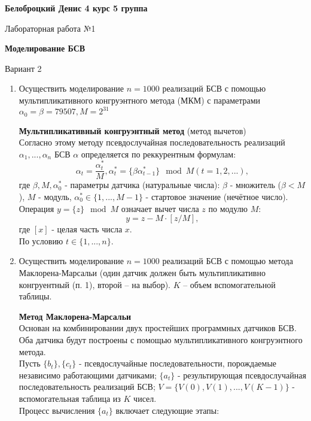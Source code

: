 \documentclass[12pt]{article}
\begin{document}
\par \textbf{Белоброцкий Денис 4 курс 5 группа}
\begin{center}
Лабораторная работа №1 
\end{center} 
\begin{center}
\textbf{Моделирование БСВ}
\end{center} 
\begin{center}
Вариант 2
\end{center}

\begin{enumerate}
\item Осуществить моделирование $ n = 1000 $ реализаций БСВ с помощью мультипликативного конгруэнтного метода (МКМ) с параметрами $ \alpha_{0} = \beta = 79507, M = 2^{31} $
\par \textbf{Мультипликативный конгруэнтный метод} (метод вычетов) 
\\Согласно этому методу псевдослучайная последовательность реализаций $ \alpha_{1},...,\alpha_{n} $ БСВ $ \alpha $ определяется по реккурентным формулам: 
$$
\alpha_{t} = \frac{\alpha_{t}^{*}}{M}, \alpha_{t}^{*} = \lbrace \beta\alpha_{t-1}^{*} \rbrace \!\!\!\!\! \mod M (t=1,2,...),
$$
где $ \beta ,M, \alpha_{0}^{*} $ - параметры датчика (натуральные числа): $ \beta $ - множитель ($ \beta < M $), $ M $ - модуль, $ \alpha_{0}^{*} \in\lbrace 1,...,M-1 \rbrace $ - стартовое значение (нечётное число).
Операция $ y=\lbrace z \rbrace \mod M $ означает вычет числа $ z $ по модулю $ M $:
$$
y = z - M \cdot [z / M],
$$
где $ [x] $ - целая часть числа $ x $.
\\По условию $ t\in\lbrace 1,...,n \rbrace $.
\item Осуществить моделирование $ n=1000 $ реализаций БСВ с помощью метода Маклорена-Марсальи (один датчик должен быть мультипликативно конгруентный (п. 1), второй – на выбор).
$ K $ – объем вспомогательной таблицы.
\par \textbf{Метод Маклорена-Марсальи} 
\\Основан на комбинировании двух простейших программных датчиков БСВ. Оба датчика будут построены с помощью мультипликативного конгруэнтного метода.
\\Пусть $ \lbrace b_{t} \rbrace,\lbrace c_{t} \rbrace $ - псевдослучайные последовательности, порождаемые независимо работающими датчиками; $ \lbrace a_{t} \rbrace $ - результирующая псевдослучайная последовательность реализаций БСВ; $ V=\lbrace V(0), V(1),...,V(K-1) \rbrace $ - вспомогательная таблица из $ K $ чисел.
\\Процесс вычисления $\lbrace a_{t} \rbrace$ включает следующие этапы:

\end{enumerate}
\end{document}
